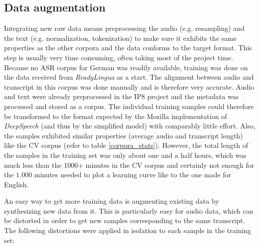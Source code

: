 \subsection{Data augmentation}

Integrating new raw data means preprocessing the audio (e.g. resampling) and the text (e.g. normalization, tokenization) to make sure it exhibits the same properties as the other corpora and the data conforms to the target format. This step is usually very time consuming, often taking most of the project time. Because no ASR corpus for German was readily available, training was done on the data received from \textit{ReadyLingua} as a start. The alignment between audio and transcript in this corpus was done manually and is therefore very accurate. Audio and text were already preprocessed in the IP8 project and the metadata was processed and stored as a corpus. The individual training samples could therefore be transformed to the format expected by the Mozilla implementation of \textit{DeepSpeech} (and thus by the simplified model) with comparably little effort. Also, the samples exhibited similar properties (average audio and transcript length) like the \ac{CV} corpus (refer to table \ref{corpora_stats}). However, the total length of the samples in the training set was only about one and a half hours, which was much less than the 1000+ minutes in the \ac{CV} corpus and certainly not enough for the $1.000$ minutes needed to plot a learning curve like to the one made for English. 

An easy way to get more training data is augmenting existing data by synthesizing new data from it. This is particularly easy for audio data, which can be distorted in order to get new samples corresponding to the same transcript. The following distortions were applied in isolation to each sample in the training set:

